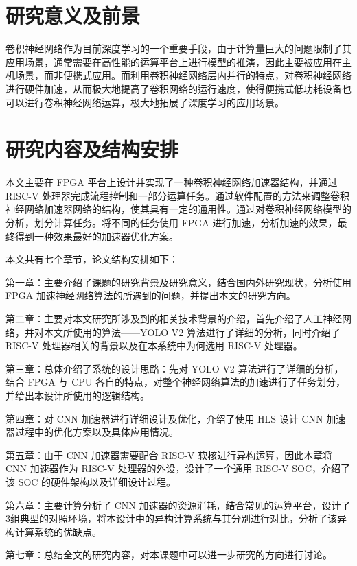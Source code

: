 

\section{研究意义及前景}

卷积神经网络作为目前深度学习的一个重要手段，由于计算量巨大的问题限制了其应用场景，通常需要在高性能的运算平台上进行模型的推演，因此主要被应用在主机场景，而非便携式应用。而利用卷积神经网络层内并行的特点，对卷积神经网络进行硬件加速，从而极大地提高了卷积网络的运行速度，使得便携式低功耗设备也可以进行卷积神经网络运算，极大地拓展了深度学习的应用场景。

\section{研究内容及结构安排}

本文主要在 FPGA 平台上设计并实现了一种卷积神经网络加速器结构，并通过 RISC-V 处理器完成流程控制和一部分运算任务。通过软件配置的方法来调整卷积神经网络加速器网络的结构，使其具有一定的通用性。通过对卷积神经网络模型的分析，划分计算任务。将不同的任务使用 FPGA 进行加速，分析加速的效果，最终得到一种效果最好的加速器优化方案。

本文共有七个章节，论文结构安排如下：

第一章：主要介绍了课题的研究背景及研究意义，结合国内外研究现状，分析使用 FPGA 加速神经网络算法的所遇到的问题，并提出本文的研究方向。

第二章：主要对本文研究所涉及到的相关技术背景的介绍，首先介绍了人工神经网络，并对本文所使用的算法——YOLO V2 算法进行了详细的分析，同时介绍了 RISC-V 处理器相关的背景以及在本系统中为何选用 RISC-V 处理器。

第三章：总体介绍了系统的设计思路：先对 YOLO V2 算法进行了详细的分析，结合 FPGA 与 CPU 各自的特点，对整个神经网络算法的加速进行了任务划分，并给出本设计所使用的逻辑结构。

第四章：对 CNN 加速器进行详细设计及优化，介绍了使用 HLS 设计 CNN 加速器过程中的优化方案以及具体应用情况。

第五章：由于 CNN 加速器需要配合 RISC-V 软核进行异构运算，因此本章将 CNN 加速器作为 RISC-V 处理器的外设，设计了一个通用 RISC-V SOC，介绍了该 SOC 的硬件架构以及详细设计过程。

第六章：主要计算分析了 CNN 加速器的资源消耗，结合常见的运算平台，设计了3组典型的对照环境，将本设计中的异构计算系统与其分别进行对比，分析了该异构计算系统的优缺点。

第七章：总结全文的研究内容，对本课题中可以进一步研究的方向进行讨论。



